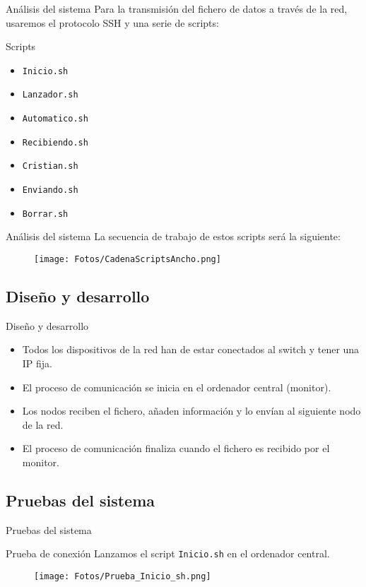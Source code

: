 \documentclass[aspectratio=169]{beamer}
\begin{document}
\begin{frame}{Análisis del sistema}
	Para la transmisión del fichero de datos a través de la red, usaremos el protocolo SSH y una serie de scripts:
	\begin{block}{Scripts}
		\begin{itemize}
			\item \texttt{Inicio.sh}
			\item \texttt{Lanzador.sh}
			\item \texttt{Automatico.sh}
			\item \texttt{Recibiendo.sh}
			\item \texttt{Cristian.sh}
			\item \texttt{Enviando.sh}
			\item \texttt{Borrar.sh}
		\end{itemize}
	\end{block}
\end{frame}

\begin{frame}{Análisis del sistema}
	La secuencia de trabajo de estos scripts será la siguiente:
	\begin{figure}[h]
		\centering
		\texttt{[image: Fotos/CadenaScriptsAncho.png]}
	\end{figure}
\end{frame}

\subsection{Diseño y desarrollo}
\begin{frame}{Diseño y desarrollo}
\begin{itemize}
	\item Todos los dispositivos de la red han de estar conectados al switch y tener una IP fija.
	\item El proceso de comunicación se inicia en el ordenador central (monitor).
	\item Los nodos reciben el fichero, añaden información y lo envían al siguiente nodo de la red.
	\item El proceso de comunicación finaliza cuando el fichero es recibido por el monitor.
\end{itemize}
\end{frame}

\subsection{Pruebas del sistema}
\begin{frame}{Pruebas del sistema}
\begin{block}{Prueba de conexión}
	Lanzamos el script \texttt{Inicio.sh} en el ordenador central.
	\begin{figure}[h]
		\texttt{[image: Fotos/Prueba\_Inicio\_sh.png]}
	\end{figure}
\end{block}
\end{frame}
\end{document}
